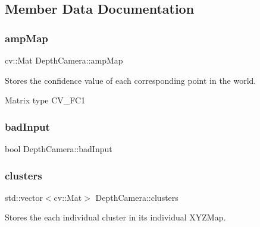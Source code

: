 \subsection{Member Data Documentation}
\hypertarget{class_depth_camera_a067d5cd9eedcdaa95cc440e7381fdb9c}{}\label{class_depth_camera_a067d5cd9eedcdaa95cc440e7381fdb9c} 
\subsubsection{\texorpdfstring{amp\+Map}{ampMap}}
{\footnotesize\ttfamily cv\+::\+Mat Depth\+Camera\+::amp\+Map\hspace{0.3cm}{\ttfamily [protected]}}



Stores the confidence value of each corresponding point in the world. 

Matrix type C\+V\+\_\+F\+C1 \hypertarget{class_depth_camera_a28f1ed73b3be887b3da06334416ac91a}{}\label{class_depth_camera_a28f1ed73b3be887b3da06334416ac91a} 
\subsubsection{\texorpdfstring{bad\+Input}{badInput}}
{\footnotesize\ttfamily bool Depth\+Camera\+::bad\+Input}

\hypertarget{class_depth_camera_a333347ab312906b2196596b078fc98b4}{}\label{class_depth_camera_a333347ab312906b2196596b078fc98b4} 
\subsubsection{\texorpdfstring{clusters}{clusters}}
{\footnotesize\ttfamily std\+::vector$<$cv\+::\+Mat$>$ Depth\+Camera\+::clusters\hspace{0.3cm}{\ttfamily [protected]}}



Stores the each individual cluster in its individual X\+Y\+Z\+Map. 

\hypertarget{class_depth_camera_a4a2bb91ca2e9be53a53c4a6dcf0e1677}{}\label{class_depth_camera_a4a2bb91ca2e9be53a53c4a6dcf0e1677} 
